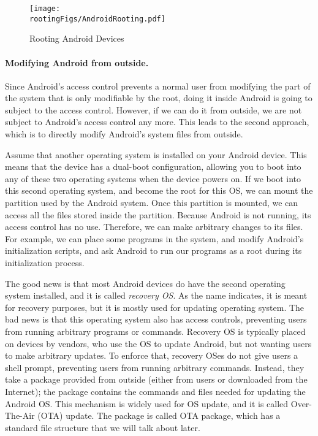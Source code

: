 \begin{figure}[htb]
	\begin{center}
		\texttt{[image: \\rootingFigs/AndroidRooting.pdf]}
	\end{center}
	\caption{Rooting Android Devices}
	\label{fig:rooting:androidrooting}
\end{figure}
 

\paragraph{Modifying Android from outside.}
Since Android's access control prevents a normal user from modifying the
part of the system that is only modifiable by the root, doing 
it inside Android is going to subject to the access control. However, if we can
do it from outside, we are not subject to Android's access control any
more. This leads to the second approach, which is to directly modify 
Android's system files from outside. 

 
Assume that another operating system is installed on your Android device. 
This means that the device has a dual-boot configuration, allowing you to boot into any
of these two operating systems when the device powers on. If we boot into
this second operating system, and become the root for this OS, 
we can mount the partition used by the
Android system. Once this partition is mounted, we can access all the files
stored inside the partition. Because Android is not running, its access
control has no use. Therefore, we can make arbitrary changes to its files.
For example, we can place some programs in the system, and modify Android's
initialization scripts, and ask Android to run our programs as a root
during its initialization process. 


The good news is that most Android devices do have the second operating
system installed, and it is called \textit{recovery OS}. As the name
indicates, it is meant for recovery purposes, but it is mostly used for
updating operating system. The bad news is that this operating system also
has access controls, preventing users from running arbitrary programs or
commands. Recovery OS is typically placed on devices by vendors, who use 
the OS to update Android, but not wanting users to make arbitrary updates. 
To enforce that, recovery OSes do not give users a shell prompt, preventing
users from running arbitrary commands. Instead, they take a package provided
from outside (either from users or downloaded from the Internet); the
package contains the commands and files needed for updating the 
Android OS. This mechanism is widely
used for OS update, and it is called Over-The-Air (OTA) update. The package is
called OTA package, which has a standard file structure that we will
talk about later. 


